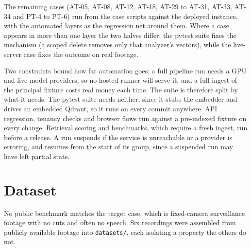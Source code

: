\documentclass[11pt,a4paper]{article}
\begin{document}
The remaining cases (AT-05, AT-08, AT-12, AT-18, AT-29 to AT-31, AT-33, AT-34 and PT-4
to PT-6) run from the case scripts against the deployed instance, with the automated
layers as the regression net around them. Where a case appears in more than one layer the
two halves differ: the pytest suite fixes the mechanism (a scoped delete removes only that
analyzer's vectors), while the live-server case fixes the outcome on real footage.

Two constraints bound how far automation goes: a full pipeline run needs a GPU and live
model providers, so no hosted runner will serve it, and a full ingest of the principal
fixture costs real money each time. The suite is therefore split by what it needs. The
pytest suite needs neither, since it stubs the embedder and drives an embedded Qdrant, so it
runs on every commit anywhere. API regression, tenancy checks and browser flows run against
a pre-indexed fixture on every change. Retrieval scoring and benchmarks, which require a
fresh ingest, run before a release. A run suspends if the service is unreachable or a
provider is erroring, and resumes from the start of its group, since a suspended run may
have left partial state.

\section{Dataset}

No public benchmark matches the target case, which is fixed-camera surveillance footage with no
cuts and often no speech. Six recordings were assembled from publicly available footage
into \texttt{datasets/}, each isolating a property the others do not.
\end{document}
